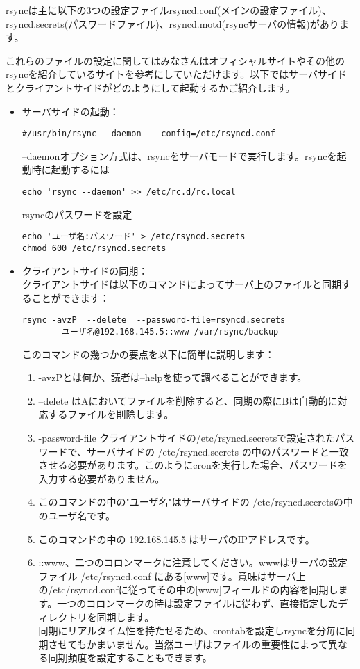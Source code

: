 rsyncは主に以下の3つの設定ファイルrsyncd.conf(メインの設定ファイル)、rsyncd.secrets(パスワードファイル)、rsyncd.motd(rsyncサーバの情報)があります。

これらのファイルの設定に関してはみなさんはオフィシャルサイトやその他のrsyncを紹介しているサイトを参考にしていただけます。以下ではサーバサイドとクライアントサイドがどのようにして起動するかご紹介します。

\begin{itemize}
  \item サーバサイドの起動：
\begin{lstlisting}[numbers=none]
#/usr/bin/rsync --daemon  --config=/etc/rsyncd.conf
\end{lstlisting}
 --daemonオプション方式は、rsyncをサーバモードで実行します。rsyncを起動時に起動するには
\begin{lstlisting}[numbers=none]
echo 'rsync --daemon' >> /etc/rc.d/rc.local
\end{lstlisting}
rsyncのパスワードを設定
\begin{lstlisting}[numbers=none]
echo 'ユーザ名:パスワード' > /etc/rsyncd.secrets
chmod 600 /etc/rsyncd.secrets
\end{lstlisting}
  \item クライアントサイドの同期：\\ クライアントサイドは以下のコマンドによってサーバ上のファイルと同期することができます：
    \begin{lstlisting}[numbers=none]
rsync -avzP  --delete  --password-file=rsyncd.secrets
        ユーザ名@192.168.145.5::www /var/rsync/backup
    \end{lstlisting}
このコマンドの幾つかの要点を以下に簡単に説明します：
\begin{enumerate}
  \item -avzPとは何か、読者は--helpを使って調べることができます。
  \item --delete はAにおいてファイルを削除すると、同期の際にBは自動的に対応するファイルを削除します。
  \item -password-file クライアントサイドの/etc/rsyncd.secretsで設定されたパスワードで、サーバサイドの /etc/rsyncd.secrets の中のパスワードと一致させる必要があります。このようにcronを実行した場合、パスワードを入力する必要がありません。
  \item このコマンドの中の"ユーザ名"はサーバサイドの /etc/rsyncd.secretsの中のユーザ名です。
  \item このコマンドの中の 192.168.145.5 はサーバのIPアドレスです。
  \item ::www、二つのコロンマークに注意してください。wwwはサーバの設定ファイル /etc/rsyncd.conf にある[www]です。意味はサーバ上の/etc/rsyncd.confに従ってその中の[www]フィールドの内容を同期します。一つのコロンマークの時は設定ファイルに従わず、直接指定したディレクトリを同期します。\\ 同期にリアルタイム性を持たせるため、crontabを設定しrsyncを分毎に同期させてもかまいません。当然ユーザはファイルの重要性によって異なる同期頻度を設定することもできます。
\end{enumerate}
\end{itemize}


